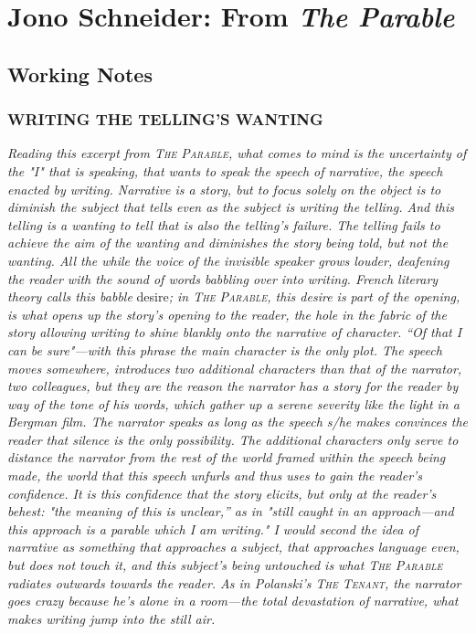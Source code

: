 \documentclass[
]{memoir}
\begin{document}
\hypertarget{jono-schneider-from-the-parable}{%
\chapter{\texorpdfstring{Jono Schneider: From \emph{The
Parable}}{Jono Schneider: From The Parable}}\label{jono-schneider-from-the-parable}}

\hypertarget{working-notes-6}{%
\section*{Working Notes}\label{working-notes-6}}

\hypertarget{writing-the-tellings-wanting}{%
\subsection*{WRITING THE TELLING'S
WANTING}\label{writing-the-tellings-wanting}}

\emph{Reading this excerpt from \textsc{The Parable}, what comes to mind
is the uncertainty of the "I" that is speaking, that wants to speak the
speech of narrative, the speech enacted by writing. Narrative is a
story, but to focus solely on the object is to diminish the subject that
tells even as the subject is writing the telling. And this telling is a
wanting to tell that is also the telling's failure. The telling fails to
achieve the aim of the wanting and diminishes the story being told, but
not the wanting. All the while the voice of the invisible speaker grows
louder, deafening the reader with the sound of words babbling over into
writing. French literary theory calls this babble} desire\emph{; in
\textsc{The Parable}, this desire is part of the opening, is what opens
up the story's opening to the reader, the hole in the fabric of the
story allowing writing to shine blankly onto the narrative of character.
``Of that I can be sure"---with this phrase the main character is the
only plot. The speech moves somewhere, introduces two additional
characters than that of the narrator, two colleagues, but they are the
reason the narrator has a story for the reader by way of the tone of his
words, which gather up a serene severity like the light in a Bergman
film. The narrator speaks as long as the speech s/he makes convinces the
reader that silence is the only possibility. The additional characters
only serve to distance the narrator from the rest of the world framed
within the speech being made, the world that this speech unfurls and
thus uses to gain the reader's confidence. It is this confidence that
the story elicits, but only at the reader's behest: "the meaning of this
is unclear,'' as in "still caught in an approach---and this approach is
a parable which I am writing." I would second the idea of narrative as
something that approaches a subject, that approaches language even, but
does not touch it, and this subject's being untouched is what
\textsc{The Parable} radiates outwards towards the reader. As in
Polanski's \textsc{The Tenant}, the narrator goes crazy because he's
alone in a room---the total devastation of narrative, what makes writing
jump into the still air.}
\end{document}
